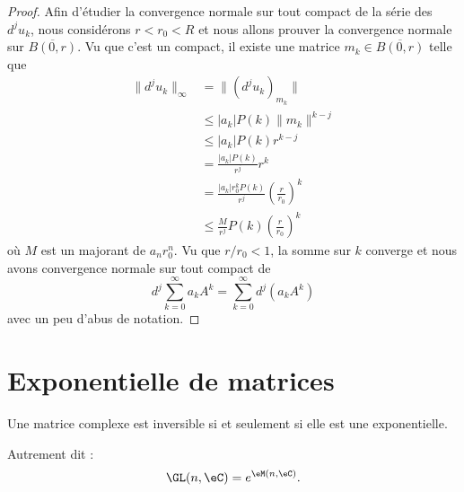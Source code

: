 \begin{proof}
	Afin d'étudier la convergence normale sur tout compact de la série des \( d^ju_k\), nous considérons \( r<r_0<R\) et nous allons prouver la convergence normale sur \( \overline{ B(0,r) }\). Vu que c'est un compact, il existe une matrice \( m_k\in\overline{ B(0,r) }\) telle que
	\begin{subequations}
		\begin{align}
			\| d^ju_k \|_{\infty} & =\| (d^ju_k)_{m_k} \|                                               \\
			                      & \leq | a_k |P(k)\| m_k \|^{k-j}                                     \\
			                      & \leq | a_k |P(k)r^{k-j}                                             \\
			                      & =\frac{ | a_k |P(k) }{ r^j }r^k                                     \\
			                      & =\frac{ | a_k |r_0^kP(k) }{ r^j }\left( \frac{ r }{ r_0 } \right)^k \\
			                      & \leq \frac{ M }{ r^j }P(k)\left( \frac{ r }{ r_0 } \right)^k
		\end{align}
	\end{subequations}
	où \( M\) est un majorant de \( a_nr_0^n\). Vu que \( r/r_0<1\), la somme sur \( k\) converge et nous avons convergence normale sur tout compact de
	\begin{equation}
		d^j\sum_{k=0}^{\infty}a_kA^k=\sum_{k=0}^{\infty}d^j(a_kA^k)
	\end{equation}
	avec un peu d'abus de notation.
\end{proof}

\section{Exponentielle de matrices}

\begin{proposition} \label{PropKKdmnkD}
	Une matrice complexe est inversible si et seulement si elle est une exponentielle.

	Autrement dit :
	\begin{equation}
		\GL(n,\eC)= e^{\eM(n,\eC)}.
	\end{equation}
\end{proposition}

